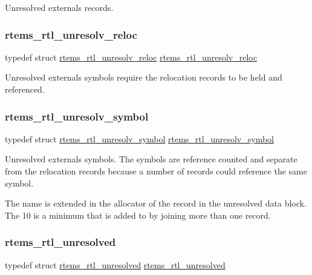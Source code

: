Unresolved externals records. \mbox{\label{rtl-unresolved_8h_a1c793e6acb096dd94eab9394794a2cf4}} 
\subsubsection{\texorpdfstring{rtems\_rtl\_unresolv\_reloc}{rtems\_rtl\_unresolv\_reloc}}
{\footnotesize\ttfamily typedef struct \mbox{\hyperlink{structrtems__rtl__unresolv__reloc}{rtems\+\_\+rtl\+\_\+unresolv\+\_\+reloc}}  \mbox{\hyperlink{structrtems__rtl__unresolv__reloc}{rtems\+\_\+rtl\+\_\+unresolv\+\_\+reloc}}}

Unresolved externals symbols require the relocation records to be held and referenced. \mbox{\label{rtl-unresolved_8h_a749f8beccfca47be5b0391cb8a5e7a13}} 
\subsubsection{\texorpdfstring{rtems\_rtl\_unresolv\_symbol}{rtems\_rtl\_unresolv\_symbol}}
{\footnotesize\ttfamily typedef struct \mbox{\hyperlink{structrtems__rtl__unresolv__symbol}{rtems\+\_\+rtl\+\_\+unresolv\+\_\+symbol}}  \mbox{\hyperlink{structrtems__rtl__unresolv__symbol}{rtems\+\_\+rtl\+\_\+unresolv\+\_\+symbol}}}

Unresolved externals symbols. The symbols are reference counted and separate from the relocation records because a number of records could reference the same symbol.

The name is extended in the allocator of the record in the unresolved data block. The 10 is a minimum that is added to by joining more than one record. \mbox{\label{rtl-unresolved_8h_ada747123b150ce24a6f9ad574d151e44}} 
\subsubsection{\texorpdfstring{rtems\_rtl\_unresolved}{rtems\_rtl\_unresolved}}
{\footnotesize\ttfamily typedef struct \mbox{\hyperlink{structrtems__rtl__unresolved}{rtems\+\_\+rtl\+\_\+unresolved}}  \mbox{\hyperlink{structrtems__rtl__unresolved}{rtems\+\_\+rtl\+\_\+unresolved}}}

